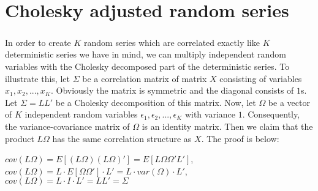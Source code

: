 \chapter{Cholesky adjusted random series}
\label{appa}

\paragraph*{}In order to create $K$ random series which are correlated exactly like $K$ deterministic series we have in mind, we can multiply independent random variables with the Cholesky decomposed part of the deterministic series. To illustrate this, let $\Sigma$ be a correlation matrix of matrix $X$ consisting of variables $x_1, x_2, ..., x_K$. Obviously the matrix is symmetric and the diagonal consists of $1$s. Let $\Sigma = LL'$ be a Cholesky decomposition of this matrix. Now, let $\Omega$ be a vector of $K$ independent random variables $\epsilon_1, \epsilon_2, ..., \epsilon_K$ with variance $1$. Consequently, the variance-covariance matrix of $\Omega$ is an identity matrix. Then we claim that the product $L\Omega$ has the same correlation structure as $X$. The proof is below:

\begin{center}
  $cov(L\Omega) = E[(L\Omega)(L\Omega)'] = E[L\Omega\Omega'L']$,\\
  $cov(L\Omega) = L \cdot E[\Omega\Omega'] \cdot L' = L \cdot var(\Omega) \cdot L'$,\\
  $cov(L\Omega) = L\cdot I \cdot L' = LL' = \Sigma$
\end{center}
